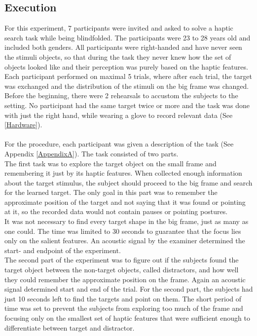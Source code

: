 \subsection{Execution}  
For this experiment, 7 participants were invited and asked to solve a haptic search task while being blindfolded. The participants were 23 to 28 years old and included both genders. All participants were right-handed and have never seen the stimuli objects, so that during the task they never knew how the set of objects looked like and their perception was purely based on the haptic features.\\
Each participant performed on maximal 5 trials, where after each trial, the target was exchanged and the distribution of the stimuli on the big frame was changed. Before the beginning, there were 2 rehearsals to accustom the subjects to the setting. No participant had the same target twice or more and the task was done with just the right hand, while wearing a glove to record relevant data (See \ref{Hardware}).\\
\\
For the procedure, each participant was given a description of the task (See Appendix \ref{AppendixA}). The task consisted of two parts. \\
The first task was to explore the target object on the small frame and remembering it just by its haptic features. When collected enough information about the target stimulus, the subject should proceed to the big frame and search for the learned target. The only goal in this part was to remember the approximate position of the target and not saying that it was found or pointing at it, so the recorded data would not contain pauses or pointing postures.\\
It was not necessary to find every target shape in the big frame, just as many as one could. The time was limited to 30 seconds to guarantee that the focus lies only on the salient features. An acoustic signal by the examiner determined the start- and endpoint of the experiment.\\
The second part of the experiment was to figure out if the subjects found the target object between the non-target objects, called distractors, and how well they could remember the approximate position on the frame. Again an acoustic signal determined start and end of the trial. For the second part, the subjects had just 10 seconds left to find the targets and point on them. The short period of time was set to prevent the subjects from exploring too much of the frame and focusing only on the smallest set of haptic features that were sufficient enough to differentiate between target and distractor.\\

